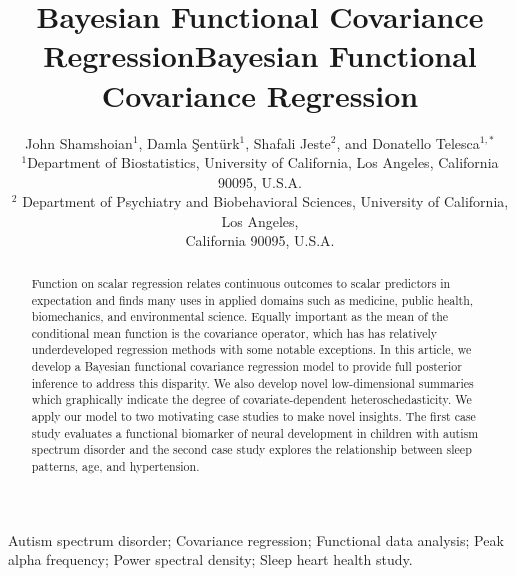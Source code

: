 \documentclass[useAMS,referee,usenatbib]{biom}
\title[This is an Example of Recto Running Head]{Bayesian Functional Covariance Regression}
\author{John Shamshoian$^{1}$\email{donatello.telesca@ucla.edu}, Damla {\c S}ent{\"u}rk$^{1}$, Shafali Jeste$^{2}$, and Donatello Telesca$^{1,*}$ \\$^{1}$Department of Biostatistics, University of California, Los Angeles, California 90095, U.S.A.\\$^{2}$ Department of Psychiatry and Biobehavioral Sciences, University of California, Los Angeles,\\ California 90095, U.S.A.}
\title[Bayesian Functional Covariance Regression]{Bayesian Functional Covariance Regression}
\begin{document}
\label{firstpage}


\begin{abstract}
	
	Function on scalar regression relates continuous outcomes to scalar predictors in expectation and finds many uses in applied domains such as medicine, public health, biomechanics, and environmental science. Equally important as the mean of the conditional mean function is the covariance operator, which has has relatively underdeveloped regression methods with some notable exceptions. In this article, we develop a Bayesian functional covariance regression model to provide full posterior inference to address this disparity. We also develop novel low-dimensional summaries which graphically indicate the degree of covariate-dependent heteroschedasticity. We apply our model to two motivating case studies to make novel insights. The first case study evaluates a functional biomarker of neural development in children with autism spectrum disorder and the second case study  explores the relationship between sleep patterns, age, and hypertension. 
\end{abstract}

%

\begin{keywords}
	Autism spectrum disorder; Covariance regression; Functional data analysis; Peak alpha frequency; Power spectral density; Sleep heart health study.
\end{keywords}
\end{document}

